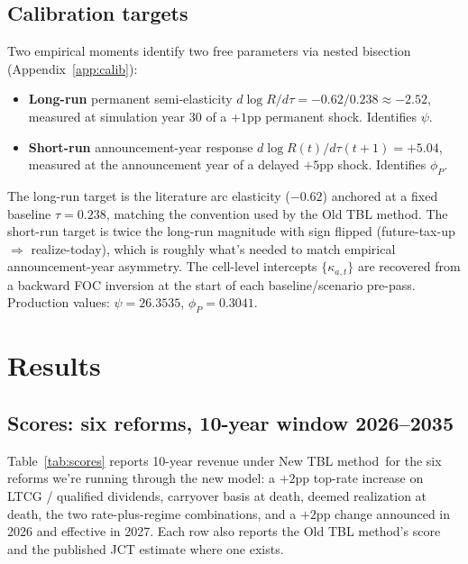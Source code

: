 \documentclass[11pt]{article}
\newcommand{\dyn}{New TBL method}
\newcommand{\oldm}{Old TBL method}
\begin{document}
\subsection{Calibration targets}
\label{sec:calib}

Two empirical moments identify two free parameters via nested bisection
(Appendix~\ref{app:calib}):
\begin{itemize}
  \item \textbf{Long-run} permanent semi-elasticity
        $d\log R / d\tau = -0.62 / 0.238 \approx -2.52$, measured at
        simulation year 30 of a $+1$pp permanent shock. Identifies $\psi$.
  \item \textbf{Short-run} announcement-year response
        $d\log R(t) / d\tau(t+1) = +5.04$, measured at the announcement
        year of a delayed $+5$pp shock. Identifies $\phi_P$.
\end{itemize}
The long-run target is the literature arc elasticity ($-0.62$) anchored at
a fixed baseline $\tau = 0.238$, matching the convention used by the
\oldm. The short-run target is twice the long-run
magnitude with sign flipped (future-tax-up $\Rightarrow$ realize-today),
which is roughly what's needed to match empirical announcement-year
asymmetry. The cell-level intercepts $\{\kappa_{a,t}\}$ are recovered from
a backward FOC inversion at the start of each baseline/scenario pre-pass.
Production values: $\psi = 26.3535$, $\phi_P = 0.3041$.

\section{Results}
\label{sec:results}


\subsection{Scores: six reforms, 10-year window 2026--2035}

Table~\ref{tab:scores} reports 10-year revenue under \dyn\ for the six
reforms we're running through the new model: a $+2$pp top-rate increase
on LTCG / qualified dividends, carryover basis at death, deemed
realization at death, the two rate-plus-regime combinations, and a $+2$pp
change announced in 2026 and effective in 2027. Each row also reports the
\oldm's score and the published JCT estimate where one exists.
\end{document}
